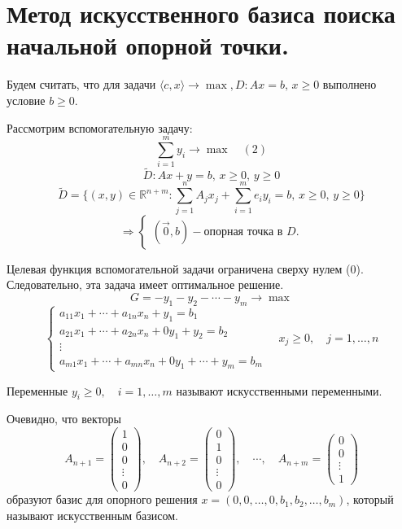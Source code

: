 \documentclass[17pt]{extarticle}
\begin{document}
\section{Метод искусственного базиса поиска \\ начальной опорной точки.}
Будем считать, что для задачи
\(
\langle c, x \rangle \rightarrow \max, D: Ax = b, \, x \geq 0
\)
выполнено условие \( b \geq 0 \).

Рассмотрим вспомогательную задачу:
\[
    \sum_{i=1}^m y_i \rightarrow \max \quad (2)
\]
\[
    \tilde{D}: Ax + y = b, \, x \geq 0, \, y \geq 0
\]
\[
    \tilde{D} = \biggl\{(x, y) \in \mathbb{R}^{n+m} : \sum_{j=1}^n A_j x_j + \sum_{i=1}^m e_i y_i = b, \, x \geq 0, \, y \geq 0\biggr\}
\]
\[
    \Rightarrow
    \begin{cases}
        (\vec{0}, b) - \text{опорная точка в } D.
    \end{cases}
\]

Целевая функция вспомогательной задачи ограничена сверху нулем (0). Следовательно, эта задача имеет оптимальное решение.
\[
    G = -y_1 - y_2 - \cdots - y_m \rightarrow \max
\]
\[
    \begin{cases}
        a_{11}x_1 + \cdots + a_{1n}x_n + y_1 = b_1        \\
        a_{21}x_1 + \cdots + a_{2n}x_n + 0y_1 + y_2 = b_2 \\
        \vdots                                            \\
        a_{m1}x_1 + \cdots + a_{mn}x_n + 0y_1 + \cdots + y_m = b_m
    \end{cases} \quad x_j \geq 0, \quad j = 1, \ldots, n
\]

Переменные $y_i \geq 0, \quad i = 1, \ldots, m$ называют искусственными переменными.

Очевидно, что векторы
\[
    A_{n+1} = \begin{pmatrix} 1 \\ 0 \\ 0 \\ \vdots \\ 0 \end{pmatrix}, \quad
    A_{n+2} = \begin{pmatrix} 0 \\ 1 \\ 0 \\ \vdots \\ 0 \end{pmatrix}, \quad
    \cdots, \quad
    A_{n+m} = \begin{pmatrix} 0 \\ 0 \\ \vdots \\ 1 \end{pmatrix}
\]
образуют базис для опорного решения \( x = (0, 0, \ldots, 0, b_1, b_2, \ldots, b_m) \), который называют искусственным базисом.
\end{document}
